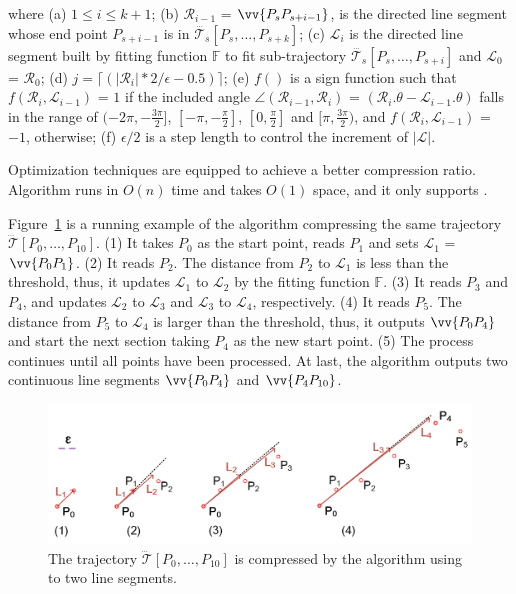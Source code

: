 \ni where (a) $1 \le i \le k+1$; (b) $\mathcal{R}_{i-1}$ = $\vv{P_sP_{s+i-1}}$, is the directed line segment whose end point $P_{s+i-1}$ is in $\dddot{\mathcal{T}_s}[P_s, \ldots, P_{s+k}]$; (c) $\mathcal{L}_{i}$ is the directed line segment built by fitting function $\mathbb{F}$ to fit sub-trajectory $\dddot{\mathcal{T}_s}[P_s, \ldots, P_{s+i}]$ and $\mathcal{L}_{0}$ = $\mathcal{R}_{0}$; (d) $j = \lceil(|\mathcal{R}_{i}|*2/\epsilon - 0.5)\rceil$; (e) $f()$ is a sign function such that $ f(\mathcal{R}_i,\mathcal{L}_{i-1})$ = $1$ if the included angle $\angle(\mathcal{R}_{i-1}, \mathcal{R}_{i})$ = $(\mathcal{R}_i.\theta - \mathcal{L}_{i-1}.\theta)$ falls in the range of $(-2\pi, -\frac{3\pi}{2}]$, $[-\pi, -\frac{\pi}{2}]$, $[0, \frac{\pi}{2}]$ and $[\pi, \frac{3\pi}{2})$, and $f(\mathcal{R}_i,\mathcal{L}_{i-1})$ = $-1$, otherwise; (f) $\epsilon/2$ is a step length to control the increment of $|\mathcal{L}|$.

Optimization techniques are equipped to achieve a better compression ratio\cite{Lin:Operb}.
Algorithm \operb runs in $O(n)$ time and takes $O(1)$ space, and it only supports \ped.


\begin{example}
	\label{exm-alg-operb}
	Figure~\ref{fig:operb} is a running example of the \operb algorithm compressing the same trajectory $\dddot{\mathcal{T}}[P_0, \ldots, P_{10}]$.
	(1) It takes $P_0$ as the start point, reads $P_1$ and sets $\mathcal{L}_1$ = $\vv{P_0P_1}$.
	(2) It reads $P_2$. The distance from $P_2$ to $\mathcal{L}_1$ is less than the threshold, thus, it updates $\mathcal{L}_1$  to $\mathcal{L}_2$ by the fitting function $\mathbb{F}$.
	(3) It reads $P_3$ and $P_4$, and updates $\mathcal{L}_2$ to $\mathcal{L}_3$ and $\mathcal{L}_3$ to $\mathcal{L}_4$, respectively.
	(4) It reads $P_5$. The distance from $P_5$ to $\mathcal{L}_4$ is larger than the threshold, thus, it outputs $\vv{P_0P_4}$ and start the next section taking $P_4$ as the new start point.
	(5) The process continues until all points have been processed. At last, the algorithm outputs two continuous line segments $\vv{P_0P_4}$ and $\vv{P_4P_{10}}$.
\end{example}

\begin{figure}[tb!]
	\centering
	\includegraphics[scale=0.66]{Figures/Fig-OPER.png}
	\vspace{-5ex}
	\caption{\small The trajectory $\dddot{\mathcal{T}}[P_0, \ldots, P_{10}]$ is compressed by the \operb algorithm using \ped to two line segments.}
	\vspace{-2ex}
	\label{fig:operb}
\end{figure}


